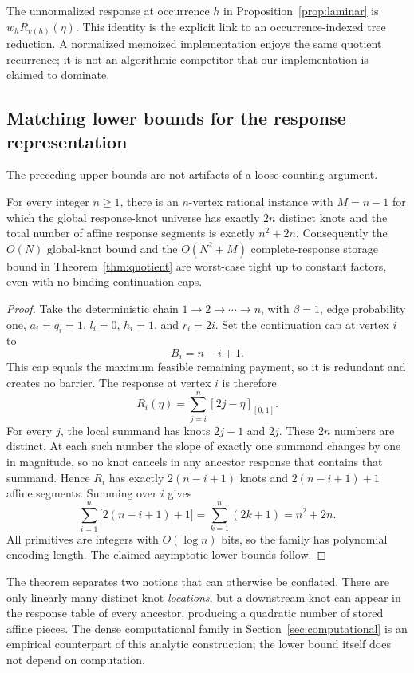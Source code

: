 The unnormalized response at occurrence $h$ in Proposition~\ref{prop:laminar} is $w_hR_{v(h)}(\eta)$. This identity is the explicit link to an occurrence-indexed tree reduction. A normalized memoized implementation enjoys the same quotient recurrence; it is not an algorithmic competitor that our implementation is claimed to dominate.

\subsection{Matching lower bounds for the response representation}
The preceding upper bounds are not artifacts of a loose counting argument.

\begin{theorem}\label{thm:tight-response}
For every integer $n\geq1$, there is an $n$-vertex rational instance with $M=n-1$ for which the global response-knot universe has exactly $2n$ distinct knots and the total number of affine response segments is exactly $n^2+2n$. Consequently the $O(N)$ global-knot bound and the $O(N^2+M)$ complete-response storage bound in Theorem~\ref{thm:quotient} are worst-case tight up to constant factors, even with no binding continuation caps.
\end{theorem}
\begin{proof}
Take the deterministic chain $1\to2\to\cdots\to n$, with $\beta=1$, edge probability one, $a_i=q_i=1$, $l_i=0$, $h_i=1$, and $r_i=2i$. Set the continuation cap at vertex $i$ to
\[
 B_i=n-i+1.
\]
This cap equals the maximum feasible remaining payment, so it is redundant and creates no barrier. The response at vertex $i$ is therefore
\begin{equation}\label{eq:tight-chain}
 R_i(\eta)=\sum_{j=i}^{n}[2j-\eta]_{[0,1]}.
\end{equation}
For every $j$, the local summand has knots $2j-1$ and $2j$. These $2n$ numbers are distinct. At each such number the slope of exactly one summand changes by one in magnitude, so no knot cancels in any ancestor response that contains that summand. Hence $R_i$ has exactly $2(n-i+1)$ knots and $2(n-i+1)+1$ affine segments. Summing over $i$ gives
\[
 \sum_{i=1}^{n}\bigl[2(n-i+1)+1\bigr]
 =\sum_{k=1}^{n}(2k+1)=n^2+2n.
\]
All primitives are integers with $O(\log n)$ bits, so the family has polynomial encoding length. The claimed asymptotic lower bounds follow.
\end{proof}

The theorem separates two notions that can otherwise be conflated. There are only linearly many distinct knot \emph{locations}, but a downstream knot can appear in the response table of every ancestor, producing a quadratic number of stored affine pieces. The dense computational family in Section~\ref{sec:computational} is an empirical counterpart of this analytic construction; the lower bound itself does not depend on computation.

